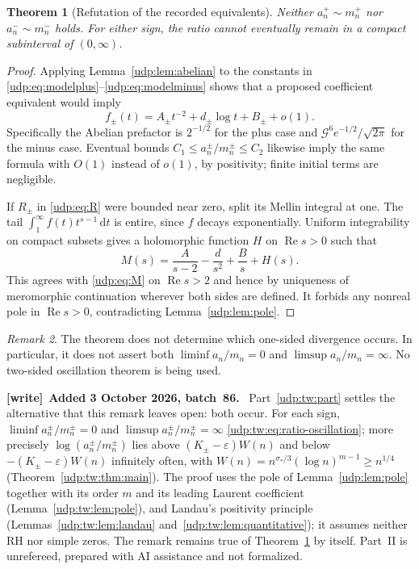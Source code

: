 \documentclass[11pt]{article}
\newtheorem{theorem}{Theorem}[section]
\theoremstyle{remark}\newtheorem{remark}[theorem]{Remark}
\DeclareMathOperator{\Rea}{Re}
\newcommand{\eps}{\varepsilon}
\newcommand{\dd}{\,\mathrm d}
\newcommand{\Gla}{\mathcal G}
\newenvironment{writenote}[1][]{\par\smallskip\begingroup\small
 \noindent\textbf{[write]}\if\relax\detokenize{#1}\relax\else~\textbf{#1.}\fi\ }%
 {\par\endgroup\smallskip}
\numberwithin{equation}{section}
\begin{document}
\begin{theorem}[Refutation of the recorded equivalents]\label{udp:thm:refutation}
Neither $a_n^+\sim m_n^+$ nor $a_n^-\sim m_n^-$ holds. For either sign, the ratio cannot eventually remain in a compact subinterval of $(0,\infty)$.
\end{theorem}
\begin{proof}
Applying Lemma~\ref{udp:lem:abelian} to the constants in \eqref{udp:eq:modelplus}--\eqref{udp:eq:modelminus} shows that a proposed coefficient equivalent would imply
\[
 f_\pm(t)=A_\pm t^{-2}+d_\pm\log t+B_\pm+o(1).
\]
Specifically the Abelian prefactor is $2^{-1/2}$ for the plus case and $\Gla^6e^{-1/2}/\sqrt{2\pi}$ for the minus case. Eventual bounds $C_1\le a_n^\pm/m_n^\pm\le C_2$ likewise imply the same formula with $O(1)$ instead of $o(1)$, by positivity; finite initial terms are negligible.

If $R_\pm$ in \eqref{udp:eq:R} were bounded near zero, split its Mellin integral at one. The tail $\int_1^\infty f(t)t^{s-1}\dd t$ is entire, since $f$ decays exponentially. Uniform integrability on compact subsets gives a holomorphic function $H$ on $\Rea s>0$ such that
\begin{equation}\label{udp:eq:merom}
 M(s)=\frac{A}{s-2}-\frac d{s^2}+\frac B{s}+H(s).
\end{equation}
This agrees with \eqref{udp:eq:M} on $\Rea s>2$ and hence by uniqueness of meromorphic continuation wherever both sides are defined. It forbids any nonreal pole in $\Rea s>0$, contradicting Lemma~\ref{udp:lem:pole}.
\end{proof}
\begin{remark}
The theorem does not determine which one-sided divergence occurs. In particular, it does not assert both $\liminf a_n/m_n=0$ and $\limsup a_n/m_n=\infty$. No two-sided oscillation theorem is being used.
\end{remark}
\begin{writenote}[Added 3 October 2026, batch~86]
Part~\ref{udp:tw:part} settles the alternative that this remark leaves
open: both occur. For each sign, $\liminf a_n^\pm/m_n^\pm=0$ and
$\limsup a_n^\pm/m_n^\pm=\infty$ \eqref{udp:tw:eq:ratio-oscillation}; more
precisely $\log(a_n^\pm/m_n^\pm)$ lies above $(K_\pm-\eps)W(n)$ and below
$-(K_\pm-\eps)W(n)$ infinitely often, with $W(n)=n^{\sigma_*/3}(\log
n)^{m-1}\ge n^{1/4}$ (Theorem~\ref{udp:tw:thm:main}). The proof uses the
pole of Lemma~\ref{udp:lem:pole} together with its order $m$ and its
leading Laurent coefficient (Lemma~\ref{udp:tw:lem:pole}), and Landau's
positivity principle (Lemmas~\ref{udp:tw:lem:landau}
and~\ref{udp:tw:lem:quantitative}); it assumes neither RH nor simple zeros.
The remark remains true of Theorem~\ref{udp:thm:refutation} by itself.
Part~II is unrefereed, prepared with AI assistance and not formalized.
\end{writenote}
\end{document}
